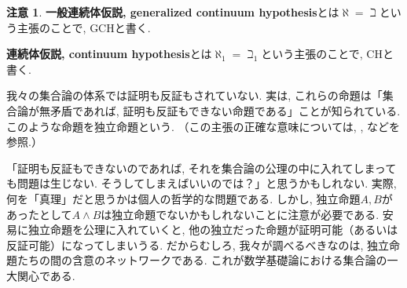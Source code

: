 \documentclass[a4paper, twoside]{bxjsarticle}
\theoremstyle{definition}
\newtheorem{rem}[thm]{注意}
\begin{document}
        \begin{rem}
            \textbf{一般連続体仮説, generalized continuum hypothesis}とは$\aleph=\beth$という主張のことで, GCHと書く.
            
            \textbf{連続体仮説, continuum hypothesis}とは$\aleph_1=\beth_1$という主張のことで, CHと書く.
            
            我々の集合論の体系では証明も反証もされていない. 実は, これらの命題は「集合論が無矛盾であれば, 証明も反証もできない命題である」ことが知られている. このような命題を独立命題という. （この主張の正確な意味については, \cite{kunenset}, \cite{arai}などを参照.）
            
            「証明も反証もできないのであれば, それを集合論の公理の中に入れてしまっても問題は生じない. そうしてしまえばいいのでは？」と思うかもしれない. 実際, 何を「真理」だと思うかは個人の哲学的な問題である. しかし, 独立命題$A, B$があったとして$A\land B$は独立命題でないかもしれないことに注意が必要である. 安易に独立命題を公理に入れていくと, 他の独立だった命題が証明可能（あるいは反証可能）になってしまいうる. だからむしろ, 我々が調べるべきなのは, 独立命題たちの間の含意のネットワークである. これが数学基礎論における集合論の一大関心である.
        \end{rem}
\end{document}
